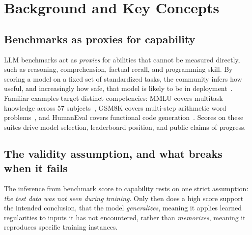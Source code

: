 %

\section{Background and Key Concepts}
\label{sec:background}

\subsection{Benchmarks as proxies for capability}
LLM benchmarks act as \emph{proxies} for abilities that cannot be measured directly, such
as reasoning, comprehension, factual recall, and programming skill. By scoring a model on
a fixed set of standardized tasks, the community infers how useful, and increasingly how
safe, that model is likely to be in deployment~\citep{hendrycks2021mmlu}. Familiar
examples target distinct competencies: MMLU covers multitask knowledge across 57
subjects~\citep{hendrycks2021mmlu}, GSM8K covers multi-step arithmetic word
problems~\citep{cobbe2021gsm8k}, and HumanEval covers functional code
generation~\citep{chen2021humaneval}. Scores on these suites drive model selection,
leaderboard position, and public claims of progress.

\subsection{The validity assumption, and what breaks when it fails}
The inference from benchmark score to capability rests on one strict assumption:
\emph{the test data was not seen during training}. Only then does a high score support
the intended conclusion, that the model \emph{generalizes}, meaning it applies learned
regularities to inputs it has not encountered, rather than \emph{memorizes}, meaning it
reproduces specific training instances.

